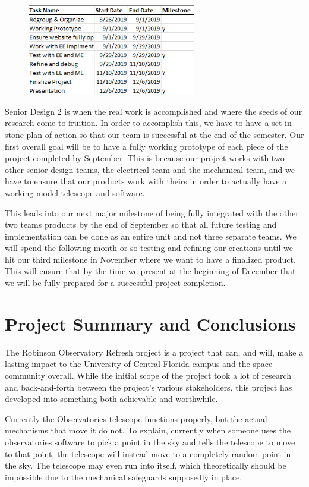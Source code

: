 \documentclass[12pt]{report}
\begin{document}
\begin{figure}[h]
	\centering
	\includegraphics[width=0.6\linewidth, height=4.0cm]{SD2Dates}
\end{figure}

Senior Design 2 is when the real work is accomplished and where the seeds of our research come to fruition. In order to accomplish this, we have to have a set-in-stone plan of action so that our team is successful at the end of the semester. Our first overall goal will be to have a fully working prototype of each piece of the project completed by September. This is because our project works with two other senior design teams, the electrical team and the mechanical team, and we have to ensure that our products work with theirs in order to actually have a working model telescope and software. 

This leads into our next major milestone of being fully integrated with the other two teams products by the end of September so that all future testing and implementation can be done as an entire unit and not three separate teams. We will spend the following month or so testing and refining our creations until we hit our third milestone in November where we want to have a finalized product. This will ensure that by the time we present at the beginning of December that we will be fully prepared for a successful project completion.

\section*{Project Summary and Conclusions}

The Robinson Observatory Refresh project is a project that can, and will, make a lasting impact to the University of Central Florida campus and the space community overall. While the initial scope of the project took a lot of research and back-and-forth between the project’s various stakeholders, this project has developed into something both achievable and worthwhile. 

Currently the Observatories telescope functions properly, but the actual mechanisms that move it do not. To explain, currently when someone uses the observatories software to pick a point in the sky and tells the telescope to move to that point, the telescope will instead move to a completely random point in the sky. The telescope may even run into itself, which theoretically should be impossible due to the mechanical safeguards supposedly in place.   
\end{document}
